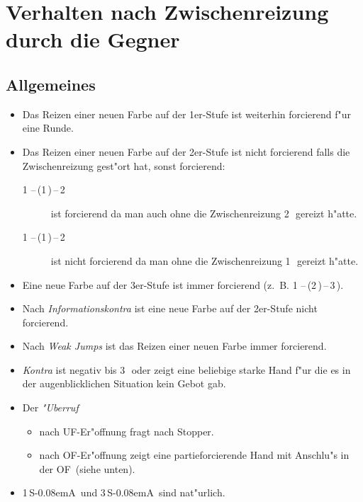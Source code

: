 \documentclass[11pt,german,twocolumn]{scrartcl}
\renewcommand{\Cl}{{\color{ClColor}{$\clubsuit$}}}
\renewcommand{\Di}{{\color{DiColor}{$\vardiamondsuit$}}}
\renewcommand{\He}{{\color{HeColor}{$\varheartsuit$}}}
\renewcommand{\Sp}{{\color{SpColor}{$\spadesuit$}}}
\def\pik{\,\Sp}
\def\coe{\,\He}
\def\kar{\,\Di}
\def\tre{\,\Cl}
\def\ufa{\textsf{UF}}
\def\ofa{\textsf{OF}}
\def\SA{\textsf{\,S\kern-0.08emA}}
\def\sep{\,--\,}
\newcommand{\conv}[1]{\emph{#1}}
\begin{document}
\section{Verhalten nach Zwischenreizung durch die Gegner}

\subsection{Allgemeines}
\begin{itemize}
\item Das Reizen einer neuen Farbe auf der 1er-Stufe ist weiterhin
forcierend f"ur eine Runde.
%
\item Das Reizen einer neuen Farbe auf der 2er-Stufe ist nicht forcierend
falls die Zwischenreizung gest"ort hat, sonst forcierend:
\begin{description}
\item[1\coe\sep(1\pik)\sep2\kar] ist forcierend da man auch
ohne die Zwischenreizung 2\kar\ gereizt h"atte.
\item[1\tre\sep(1\pik)\sep2\coe] ist nicht forcierend da man ohne die
  Zwischenreizung 1\coe\ gereizt h"atte.
\end{description}
%
\item Eine neue Farbe auf der 3er-Stufe ist immer forcierend
  (z.~B. 1\pik\sep(2\kar)\sep3\tre).
\item Nach \conv{Informationskontra} ist eine neue Farbe auf der 2er-Stufe
  nicht forcierend.
\item Nach \conv{Weak Jumps} ist das Reizen einer neuen Farbe immer
  forcierend.
\item \conv{Kontra} ist negativ bis 3\coe\ oder zeigt eine beliebige
  starke Hand f"ur die es in der augenblicklichen Situation kein Gebot
  gab.
\item Der \conv{"Uberruf}
  \begin{itemize}
    \item nach \ufa-Er"offnung fragt nach Stopper.
    \item nach \ofa-Er"offnung zeigt eine partieforcierende Hand mit
      Anschlu"s in der \ofa\ (siehe unten).
    \end{itemize}
\item 1\SA\ und 3\SA\ sind nat"urlich.
\end{itemize}
\end{document}
